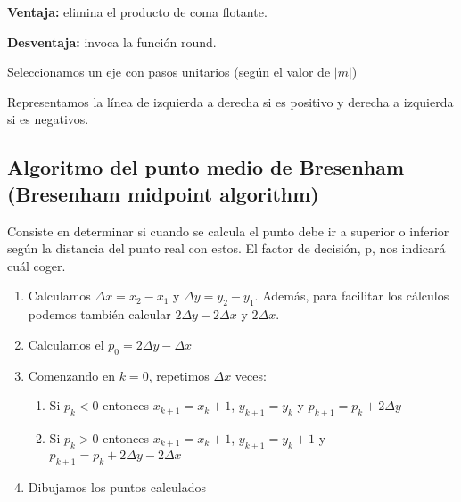 \textbf{Ventaja:} elimina el producto de coma flotante.

\textbf{Desventaja:} invoca la función round.

Seleccionamos un eje con pasos unitarios (según el valor de $|m|$)

Representamos la línea de izquierda a derecha si es positivo y derecha a izquierda  si es negativos.

\subsection{Algoritmo del punto medio de Bresenham (Bresenham midpoint algorithm)}
Consiste en determinar si cuando se calcula el punto debe ir a superior o inferior según la distancia del punto real con estos. El factor de decisión, p, nos indicará cuál coger.

\begin{enumerate}
    \item Calculamos $\Delta x = x_2 -x_1$ y $\Delta y = y_2 -y_1$. Además, para facilitar los cálculos podemos también calcular $2\Delta y - 2 \Delta x$ y $2 \Delta x$.
    \item Calculamos el $p_0=2\Delta y - \Delta x$
    \item Comenzando en $k=0$, repetimos $\Delta x$ veces:
    \begin{enumerate}
        \item Si $p_k < 0$ entonces $x_{k+1}=x_k+1$, $y_{k+1}=y_k$ y $p_{k+1}=p_k+2\Delta y$
        \item Si $p_k > 0$ entonces $x_{k+1}=x_k+1$, $y_{k+1}=y_k+1$ y $p_{k+1}=p_k+2\Delta y - 2 \Delta x$
    \end{enumerate}
    \item Dibujamos los puntos calculados
\end{enumerate}